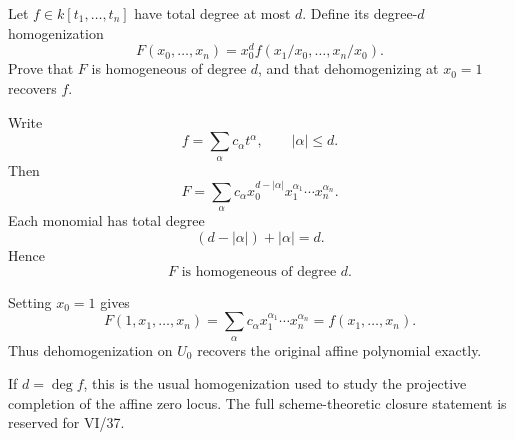 \begin{problem}\label{prob:vi36-16}
Let \(f\in k[t_1,\ldots,t_n]\) have total degree at most \(d\). Define its degree-\(d\) homogenization
\[
F(x_0,\ldots,x_n)=x_0^d f(x_1/x_0,\ldots,x_n/x_0).
\]
Prove that \(F\) is homogeneous of degree \(d\), and that dehomogenizing at \(x_0=1\) recovers \(f\).

\end{problem}

\ifdefined\FullProblemDossiers
\begin{solution}
Write
\[
f=\sum_\alpha c_\alpha t^\alpha,
\qquad
|\alpha|\le d.
\]
Then
\[
F
=
\sum_\alpha
c_\alpha
x_0^{d-|\alpha|}
x_1^{\alpha_1}\cdots x_n^{\alpha_n}.
\]
Each monomial has total degree
\[
(d-|\alpha|)+|\alpha|=d.
\]
Hence
\[
\boxed{F\text{ is homogeneous of degree }d}.
\]

Setting \(x_0=1\) gives
\[
F(1,x_1,\ldots,x_n)
=
\sum_\alpha
c_\alpha x_1^{\alpha_1}\cdots x_n^{\alpha_n}
=
f(x_1,\ldots,x_n).
\]
Thus dehomogenization on \(U_0\) recovers the original affine polynomial exactly.

If \(d=\deg f\), this is the usual homogenization used to study the projective completion of the affine zero locus.
The full scheme-theoretic closure statement is reserved for VI/37.
\end{solution}
\fi
